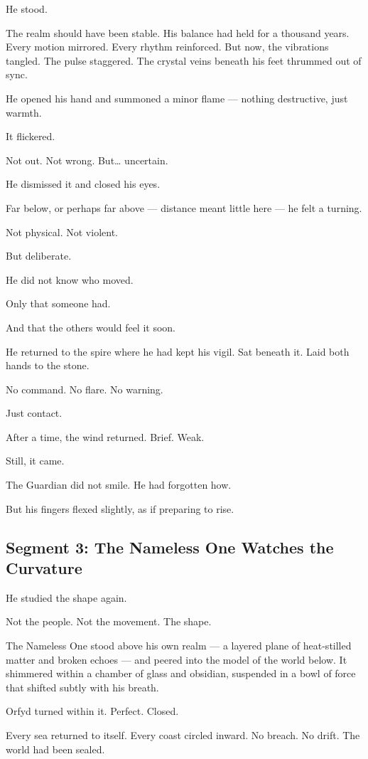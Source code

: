 \documentclass[9pt]{article}
\begin{document}
He stood.

The realm should have been stable. His balance had held for a thousand years. Every motion mirrored. Every rhythm reinforced. But now, the vibrations tangled. The pulse staggered. The crystal veins beneath his feet thrummed out of sync.

He opened his hand and summoned a minor flame — nothing destructive, just warmth.

It flickered.

Not out. Not wrong. But… uncertain.

He dismissed it and closed his eyes.

Far below, or perhaps far above — distance meant little here — he felt a turning.

Not physical. Not violent.

But deliberate.

He did not know who moved.

Only that someone had.

And that the others would feel it soon.

He returned to the spire where he had kept his vigil. Sat beneath it. Laid both hands to the stone.

No command. No flare. No warning.

Just contact.

After a time, the wind returned. Brief. Weak.

Still, it came.

The Guardian did not smile. He had forgotten how.

But his fingers flexed slightly, as if preparing to rise.

\newpage

\subsection*{Segment 3: The Nameless One Watches the Curvature}

He studied the shape again.

Not the people. Not the movement. The shape.

The Nameless One stood above his own realm — a layered plane of heat-stilled matter and broken echoes — and peered into the model of the world below. It shimmered within a chamber of glass and obsidian, suspended in a bowl of force that shifted subtly with his breath.

Orfyd turned within it. Perfect. Closed.

Every sea returned to itself. Every coast circled inward. No breach. No drift. The world had been sealed.
\end{document}
